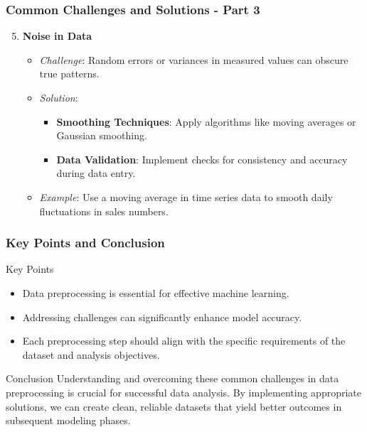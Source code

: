 \documentclass[aspectratio=169]{beamer}
\begin{document}
\begin{frame}[fragile]
    \frametitle{Common Challenges and Solutions - Part 3}
    \begin{enumerate}
        \setcounter{enumi}{4} %
        \item \textbf{Noise in Data}
            \begin{itemize}
                \item \textit{Challenge}: Random errors or variances in measured values can obscure true patterns.
                \item \textit{Solution}:
                    \begin{itemize}
                        \item \textbf{Smoothing Techniques}: Apply algorithms like moving averages or Gaussian smoothing.
                        \item \textbf{Data Validation}: Implement checks for consistency and accuracy during data entry.
                    \end{itemize}
                \item \textit{Example}: Use a moving average in time series data to smooth daily fluctuations in sales numbers.
            \end{itemize}
    \end{enumerate}
\end{frame}

\begin{frame}[fragile]
    \frametitle{Key Points and Conclusion}
    \begin{block}{Key Points}
        \begin{itemize}
            \item Data preprocessing is essential for effective machine learning.
            \item Addressing challenges can significantly enhance model accuracy.
            \item Each preprocessing step should align with the specific requirements of the dataset and analysis objectives.
        \end{itemize}
    \end{block}
    
    \begin{block}{Conclusion}
        Understanding and overcoming these common challenges in data preprocessing is crucial for successful data analysis. By implementing appropriate solutions, we can create clean, reliable datasets that yield better outcomes in subsequent modeling phases.
    \end{block}
\end{frame}
\end{document}
